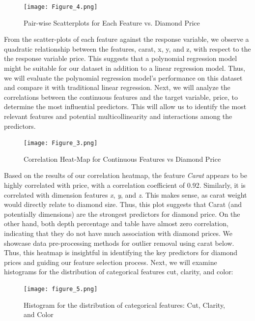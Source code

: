\documentclass[conference]{IEEEtran}
\begin{document}
\begin{figure}[H]
    \centering
    \texttt{[image: Figure\_4.png]} %
    \caption{Pair-wise Scatterplots for Each Feature vs. Diamond Price}
    \label{fig:image_label}
\end{figure}

From the scatter-plots of each feature against the response variable, we observe a quadratic relationship between the features, carat, x, y, and z, with respect to the the response variable price. This suggests that a polynomial regression model might be suitable for our dataset in addition to a linear regression model. Thus, we will evaluate the polynomial regression model's performance on this dataset and compare it with traditional linear regression. Next, we will analyze the correlations between the continuous features and the target variable, price, to determine the most influential predictors. This will allow us to identify the most relevant features and potential multicollinearity and interactions among the predictors.

\begin{figure}[H]
    \centering
    \texttt{[image: Figure\_3.png]} %
    \caption{Correlation Heat-Map for Continuous Features vs Diamond Price}
    \label{fig:image_label}
\end{figure}

Based on the results of our correlation heatmap, the feature \emph{Carat} appears to be highly correlated with price, with a correlation coefficient of 0.92. Similarly, it is correlated with dimension features \emph{x}, \emph{y}, and \emph{z}. This makes sense, as carat weight would directly relate to diamond size. Thus, this plot suggests that Carat (and potentially dimensions) are the strongest predictors for diamond price. On the other hand, both depth percentage and table have almost zero correlation, indicating that they do not have much association with diamond prices. We showcase data pre-processing methods for outlier removal using carat below. Thus, this heatmap is insightful in identifying the key predictors for diamond prices and guiding our feature selection process. Next, we will examine histograms for the distribution of categorical features cut, clarity, and color:

\begin{figure}[H]
    \centering
    \texttt{[image: figure\_5.png]} %
    \caption{Histogram for the distribution of categorical features: Cut, Clarity, and Color }
    \label{fig:image_label}
\end{figure}
\end{document}
